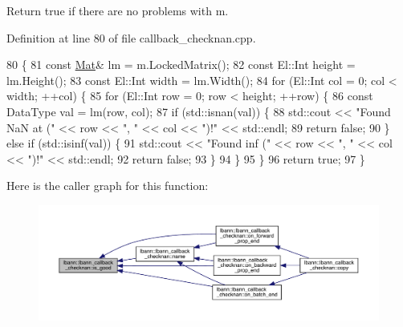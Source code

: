 Return true if there are no problems with m. 

Definition at line 80 of file callback\+\_\+checknan.\+cpp.


\begin{DoxyCode}
80                                                          \{
81   \textcolor{keyword}{const} \hyperlink{base_8hpp_a68f11fdc31b62516cb310831bbe54d73}{Mat}& lm = m.LockedMatrix();
82   \textcolor{keyword}{const} El::Int height = lm.Height();
83   \textcolor{keyword}{const} El::Int width = lm.Width();
84   \textcolor{keywordflow}{for} (El::Int col = 0; col < width; ++col) \{
85     \textcolor{keywordflow}{for} (El::Int row = 0; row < height; ++row) \{
86       \textcolor{keyword}{const} DataType val = lm(row, col);
87       \textcolor{keywordflow}{if} (std::isnan(val)) \{
88         std::cout << \textcolor{stringliteral}{"Found NaN at ("} << row << \textcolor{stringliteral}{", "} << col << \textcolor{stringliteral}{")!"} << std::endl;
89         \textcolor{keywordflow}{return} \textcolor{keyword}{false};
90       \} \textcolor{keywordflow}{else} \textcolor{keywordflow}{if} (std::isinf(val)) \{
91         std::cout << \textcolor{stringliteral}{"Found inf ("} << row << \textcolor{stringliteral}{", "} << col << \textcolor{stringliteral}{")!"} << std::endl;
92         \textcolor{keywordflow}{return} \textcolor{keyword}{false};
93       \}
94     \}
95   \}
96   \textcolor{keywordflow}{return} \textcolor{keyword}{true};
97 \}
\end{DoxyCode}
Here is the caller graph for this function\+:\nopagebreak
\begin{figure}[H]
\begin{center}
\leavevmode
\includegraphics[width=350pt]{classlbann_1_1lbann__callback__checknan_ac74f7f665823d0500875b9740aaccabc_icgraph}
\end{center}
\end{figure}
\mbox{\label{classlbann_1_1lbann__callback__checknan_ab42c997a06058c3535792408fdd5fed8}} 
